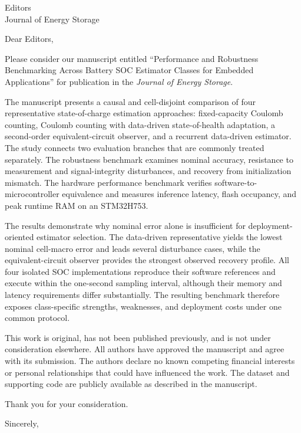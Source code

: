 \documentclass[11pt,a4paper]{letter}
\date{1 September 2026}
\begin{document}
\begin{letter}{Editors\\Journal of Energy Storage}
\opening{Dear Editors,}

Please consider our manuscript entitled ``Performance and Robustness Benchmarking Across Battery SOC Estimator Classes for Embedded Applications'' for publication in the \emph{Journal of Energy Storage}.

The manuscript presents a causal and cell-disjoint comparison of four representative state-of-charge estimation approaches: fixed-capacity Coulomb counting, Coulomb counting with data-driven state-of-health adaptation, a second-order equivalent-circuit observer, and a recurrent data-driven estimator. The study connects two evaluation branches that are commonly treated separately. The robustness benchmark examines nominal accuracy, resistance to measurement and signal-integrity disturbances, and recovery from initialization mismatch. The hardware performance benchmark verifies software-to-microcontroller equivalence and measures inference latency, flash occupancy, and peak runtime RAM on an STM32H753.

The results demonstrate why nominal error alone is insufficient for deployment-oriented estimator selection. The data-driven representative yields the lowest nominal cell-macro error and leads several disturbance cases, while the equivalent-circuit observer provides the strongest observed recovery profile. All four isolated SOC implementations reproduce their software references and execute within the one-second sampling interval, although their memory and latency requirements differ substantially. The resulting benchmark therefore exposes class-specific strengths, weaknesses, and deployment costs under one common protocol.

This work is original, has not been published previously, and is not under consideration elsewhere. All authors have approved the manuscript and agree with its submission. The authors declare no known competing financial interests or personal relationships that could have influenced the work. The dataset and supporting code are publicly available as described in the manuscript.

Thank you for your consideration.

\closing{Sincerely,}
\end{letter}
\end{document}
